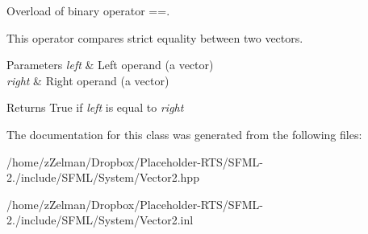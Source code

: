 Overload of binary operator ==. 

This operator compares strict equality between two vectors.


\begin{DoxyParams}{Parameters}
{\em left} & Left operand (a vector) \\
\hline
{\em right} & Right operand (a vector)\\
\hline
\end{DoxyParams}
\begin{DoxyReturn}{Returns}
True if {\itshape left} is equal to {\itshape right} 
\end{DoxyReturn}


The documentation for this class was generated from the following files\-:\begin{DoxyCompactItemize}
\item 
/home/z\-Zelman/\-Dropbox/\-Placeholder-\/\-R\-T\-S/\-S\-F\-M\-L-\/2./include/\-S\-F\-M\-L/\-System/Vector2.\-hpp\item 
/home/z\-Zelman/\-Dropbox/\-Placeholder-\/\-R\-T\-S/\-S\-F\-M\-L-\/2./include/\-S\-F\-M\-L/\-System/Vector2.\-inl\end{DoxyCompactItemize}

